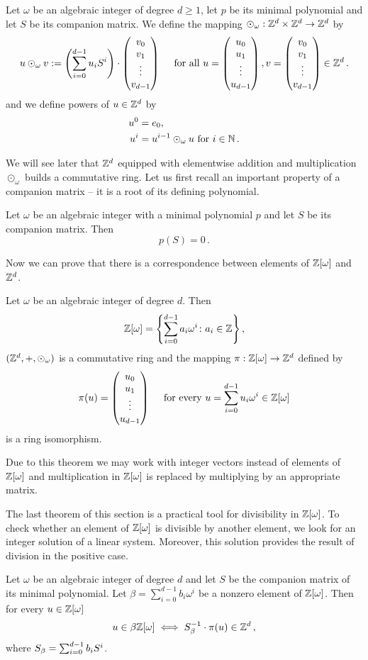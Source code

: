 \begin{upravit}
\begin{defn}
Let $\omega$ be an algebraic integer of degree $d\geq 1$, let $p$ be its minimal polynomial and let $S$ be its companion matrix. We define the mapping $\odot_\omega: \mathbb{Z}^d \times \mathbb{Z}^d \rightarrow \mathbb{Z}^d$ by 
$$
u \odot_\omega v := \left(\sum_{i=0}^{d-1} {u}_i S^i\right)\cdot \begin{pmatrix} {v}_0 \\ {v}_1 \\ \vdots \\ {v}_{d-1} \end{pmatrix} \quad \text{ for all } u=\begin{pmatrix} {u}_0 \\ {u}_1 \\ \vdots \\ {u}_{d-1} \end{pmatrix}, v=\begin{pmatrix} {v}_0 \\ {v}_1 \\ \vdots \\ {v}_{d-1} \end{pmatrix} \in \mathbb{Z}^d\,.
$$ 
and we define powers of $u \in \mathbb{Z}^d$ by
\begin{align*}
    u^0&=e_0, \\
    u^{i}&= u^{i-1} \odot_\omega u \text{ for } i\in\mathbb{N}\,.
\end{align*}
\end{defn}

We will see later that $\mathbb{Z}^d$ equipped with elementwise addition and multiplication $\odot_\omega$ builds a commutative ring. 
Let us first recall an important property of a companion matrix  -- it is a root of its defining polynomial.
\begin{lem}
\label{lem:compMatrixIsRoot}
Let $\omega$ be an algebraic integer with a minimal polynomial $p$ and let $S$ be its companion matrix. Then
$$
p(S)=0\,.
$$
\end{lem}






Now we can prove that there is a correspondence between elements of $\mathbb{Z}[\omega]$ and $\mathbb{Z}^d$.

\begin{thm}
Let  $\omega$ be an algebraic integer of degree $d$. Then 
$$
\mathbb{Z}[\omega] =\left\{\sum_{i=0}^{d-1} a_i \omega^i \colon a_i\in\mathbb{Z} \right\},
$$ 
$(\mathbb{Z}^d,+,\odot_\omega)$ is a commutative ring and the mapping $\pi:\mathbb{Z}[\omega] \rightarrow \mathbb{Z}^{d}$ defined by 
$$
\pi(u)=\begin{pmatrix} {u}_0 \\ {u}_1 \\ \vdots \\ {u}_{d-1} \end{pmatrix} \quad \text{ for every } u=\sum_{i=0}^{d-1} u_i \omega^i \in \mathbb{Z}[\omega]
$$
is a ring isomorphism.
\end{thm}


Due to this theorem we may work with integer vectors instead of elements of $\mathbb{Z}[\omega]$ and multiplication in $\mathbb{Z}[\omega]$ is replaced by multiplying by an appropriate matrix. 

The last theorem of this section is a practical tool for divisibility in $\mathbb{Z}[\omega]$. To check whether an element of $\mathbb{Z}[\omega]$ is divisible by another element, we look for an integer solution of a linear system. Moreover, this solution provides the result of  division in the positive case. 
\begin{thm}
\label{thm:divisibility}
Let $\omega$ be an algebraic integer of degree $d$ and let $S$ be the companion matrix of its minimal polynomial. Let $\beta=\sum_{i=0}^{d-1} b_i \omega^i$ be a nonzero element of $\mathbb{Z}[\omega]$. Then for every $u\in\mathbb{Z}[\omega]$
$$
u\in\beta\mathbb{Z}[\omega] \iff S_\beta^{-1}\cdot \pi(u) \in \mathbb{Z}^d\,,
$$
where $S_\beta=\sum_{i=0}^{d-1} {b}_i S^i$.
\end{thm}

\end{upravit}